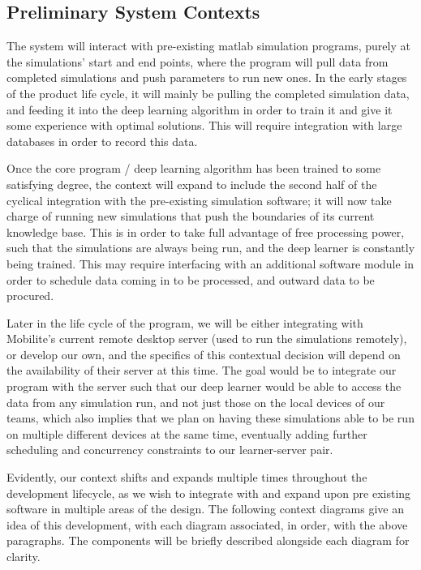 \documentclass[12pt, titlepage]{article}
\begin{document}
\subsection{Preliminary System Contexts}
\par
The system will interact with pre-existing matlab simulation programs, purely at the simulations’ start and end points, where the program will pull data from completed simulations and push parameters to run new ones. In the early stages of the product life cycle, it will mainly be pulling the completed simulation data, and feeding it into the deep learning algorithm in order to train it and give it some experience with optimal solutions. This will require integration with large databases in order to record this data. 
\par
Once the core program / deep learning algorithm has been trained to some satisfying degree, the context will expand to include the second half of the cyclical integration with the pre-existing simulation software; it will now take charge of running new simulations that push the boundaries of its current knowledge base. This is in order to take full advantage of free processing power, such that the simulations are always being run, and the deep learner is constantly being trained. This may require interfacing with an additional software module in order to schedule data coming in to be processed, and outward data to be procured.
\par 
Later in the life cycle of the program, we will be either integrating with Mobilite’s current remote desktop server (used to run the simulations remotely), or develop our own, and the specifics of this contextual decision will depend on the availability of their server at this time. The goal would be to integrate our program with the server such that our deep learner would be able to access the data from any simulation run, and not just those on the local devices of our teams, which also implies that we plan on having these simulations able to be run on multiple different devices at the same time, eventually adding further scheduling and concurrency constraints to our learner-server pair. 
\par
Evidently, our context shifts and expands multiple times throughout the development lifecycle, as we wish to integrate with and expand upon pre existing software in multiple areas of the design. The following context diagrams give an idea of this development, with each diagram associated, in order, with the above paragraphs. The components will be briefly described alongside each diagram for clarity.
\end{document}
